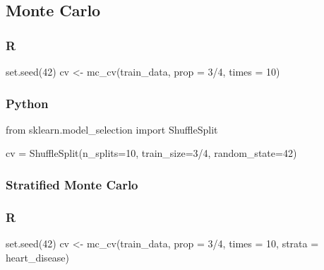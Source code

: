 \documentclass[
  letterpaper,
  DIV=11,
  numbers=noendperiod]{scrreprt}
\newenvironment{Shaded}{\begin{snugshade}}{\end{snugshade}}
\newcommand{\AttributeTok}[1]{\textcolor[rgb]{0.40,0.46,0.14}{#1}}
\newcommand{\DecValTok}[1]{\textcolor[rgb]{0.68,0.00,0.00}{#1}}
\newcommand{\FunctionTok}[1]{\textcolor[rgb]{0.28,0.35,0.67}{#1}}
\newcommand{\ImportTok}[1]{\textcolor[rgb]{0.00,0.46,0.62}{#1}}
\newcommand{\NormalTok}[1]{\textcolor[rgb]{0.00,0.46,0.62}{#1}}
\newcommand{\OperatorTok}[1]{\textcolor[rgb]{0.37,0.37,0.37}{#1}}
\newcommand{\OtherTok}[1]{\textcolor[rgb]{0.00,0.46,0.62}{#1}}
\newcommand{\SpecialCharTok}[1]{\textcolor[rgb]{0.37,0.37,0.37}{#1}}
\begin{document}
\hypertarget{monte-carlo}{%
\subsection{Monte Carlo}\label{monte-carlo}}

\hypertarget{r-58}{%
\subsubsection{R}\label{r-58}}

\begin{Shaded}
\begin{Highlighting}[]
\FunctionTok{set.seed}\NormalTok{(}\DecValTok{42}\NormalTok{)}
\NormalTok{cv }\OtherTok{\textless{}{-}} \FunctionTok{mc\_cv}\NormalTok{(train\_data, }\AttributeTok{prop =} \DecValTok{3}\SpecialCharTok{/}\DecValTok{4}\NormalTok{, }\AttributeTok{times =} \DecValTok{10}\NormalTok{)}
\end{Highlighting}
\end{Shaded}

\hypertarget{python-58}{%
\subsubsection{Python}\label{python-58}}

\begin{Shaded}
\begin{Highlighting}[]
\ImportTok{from}\NormalTok{ sklearn.model\_selection }\ImportTok{import}\NormalTok{ ShuffleSplit}

\NormalTok{cv }\OperatorTok{=}\NormalTok{ ShuffleSplit(n\_splits}\OperatorTok{=}\DecValTok{10}\NormalTok{, train\_size}\OperatorTok{=}\DecValTok{3}\OperatorTok{/}\DecValTok{4}\NormalTok{, random\_state}\OperatorTok{=}\DecValTok{42}\NormalTok{)}
\end{Highlighting}
\end{Shaded}

\hypertarget{stratified-monte-carlo}{%
\subsubsection{Stratified Monte Carlo}\label{stratified-monte-carlo}}

\hypertarget{r-59}{%
\subsubsection{R}\label{r-59}}

\begin{Shaded}
\begin{Highlighting}[]
\FunctionTok{set.seed}\NormalTok{(}\DecValTok{42}\NormalTok{)}
\NormalTok{cv }\OtherTok{\textless{}{-}} \FunctionTok{mc\_cv}\NormalTok{(train\_data, }\AttributeTok{prop =} \DecValTok{3}\SpecialCharTok{/}\DecValTok{4}\NormalTok{, }\AttributeTok{times =} \DecValTok{10}\NormalTok{, }\AttributeTok{strata =}\NormalTok{ heart\_disease)}
\end{Highlighting}
\end{Shaded}
\end{document}
